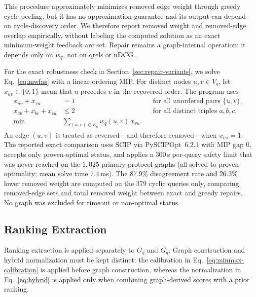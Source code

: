 \documentclass[manuscript,anonymous,review]{acmart}
\begin{document}
This procedure approximately minimizes removed edge weight through greedy cycle
peeling, but it has no approximation guarantee and its output can depend on
cycle-discovery order. We therefore report removed weight and removed-edge
overlap empirically, without labeling the computed solution as an exact
minimum-weight feedback arc set. Repair remains a graph-internal operation: it
depends only on $w_q$, not on qrels or nDCG.

For the exact robustness check in Section~\ref{sec:repair-variants}, we solve
Eq.~\eqref{eq:mwfas} with a linear-ordering MIP. For distinct nodes $u,v\in V_q$,
let $x_{uv}\in\{0,1\}$ mean that $u$ precedes $v$ in the recovered order. The
program uses
\begin{align}
  x_{uv}+x_{vu}&=1
  &&\text{for all unordered pairs }\{u,v\},
  \label{eq:ilp-anti}\\
  x_{ab}+x_{bc}+x_{ca}&\le 2
  &&\text{for all distinct triples }a,b,c,
  \label{eq:ilp-trans}\\
  \min &\sum_{(u,v)\in E_q} w_q(u,v)\,x_{vu}.
  \label{eq:ilp-obj}
\end{align}
An edge $(u,v)$ is treated as reversed---and therefore removed---when
$x_{vu}=1$. The reported exact comparison uses SCIP via PySCIPOpt~6.2.1 with
MIP gap $0$, accepts only proven-optimal status, and applies a $300$\,s
per-query safety limit that was never reached on the $1{,}025$ primary-protocol
graphs (all solved to proven optimality; mean solve time $7.4$\,ms). The
$87.9\%$ disagreement rate and $26.3\%$ lower removed weight are computed on
the $379$ cyclic queries only, comparing removed-edge sets and total removed
weight between exact and greedy repairs. No graph was excluded for timeout or
non-optimal status.

\subsection{Ranking Extraction}
\label{sec:extraction}

Ranking extraction is applied separately to $G_q$ and $\widetilde G_q$. Graph
construction and hybrid normalization must be kept distinct: the calibration
in Eq.~\eqref{eq:minmax-calibration} is applied before graph construction,
whereas the normalization in Eq.~\eqref{eq:hybrid} is applied only when
combining graph-derived scores with a prior ranking.
\end{document}
